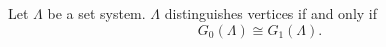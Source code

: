 Let $\Lambda$ be a set system. $\Lambda$ distinguishes vertices if and only if
$$G_0(\Lambda) \cong G_1(\Lambda).$$
